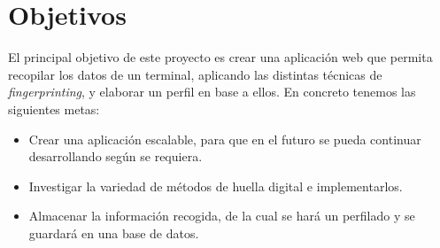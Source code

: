 \section{Objetivos}

El principal objetivo de este proyecto es crear una aplicación web que permita recopilar los datos de un terminal, aplicando las distintas técnicas de \textit{fingerprinting}, y elaborar un perfil en base a ellos. En concreto tenemos las siguientes metas:
\begin{itemize}
	\item Crear una aplicación escalable, para que en el futuro se pueda continuar desarrollando según se requiera.
	\item Investigar la variedad de métodos de huella digital e implementarlos.
	\item Almacenar la información recogida, de la cual se hará un perfilado y se guardará en una base de datos.
\end{itemize}

